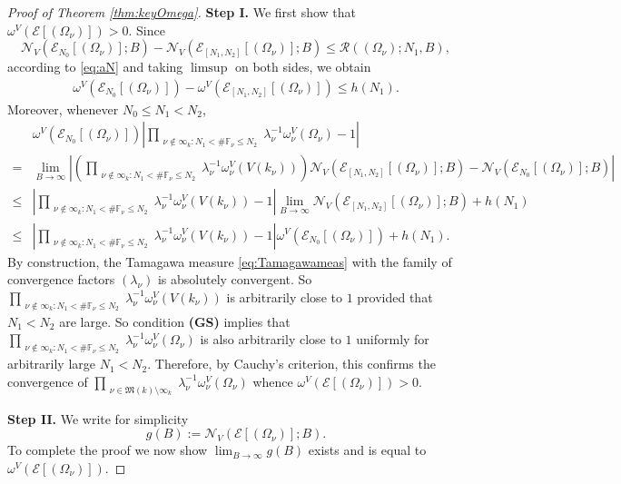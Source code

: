 \documentclass[11pt,letterpaper]{amsart}
\newcommand{\BF}{{\mathbb {F}}}
\newcommand{\CE}{{\mathcal {E}}}
\newcommand{\CN}{{\mathcal {N}}}
\newcommand{\CR}{{\mathcal {R}}}
\theoremstyle{plain}
\numberwithin{equation}{section}
\theoremstyle{definition}
\theoremstyle{remark}
\begin{document}
\begin{proof}[Proof of Theorem \ref{thm:keyOmega}]
\textbf{Step I.} We first show that $\omega^V\left(\CE[(\Omega_{\nu})]\right)>0$. Since $$\CN_V(\CE_{N_0}[(\Omega_{\nu})];B)-\CN_V\left(\CE_{[N_1,N_2]}[(\Omega_{\nu})];B\right)\leqslant \CR((\Omega_\nu);N_1,B),$$  according to \eqref{eq:aN} and 
taking $\limsup$ on both sides, we obtain
\begin{align*}
	\omega^V(\CE_{N_0}[(\Omega_{\nu})])-\omega^V(\CE_{[N_1,N_2]}[(\Omega_{\nu})])\leqslant h(N_1).
\end{align*}
Moreover, whenever $N_0\leqslant N_1<N_2$,
\begin{align*}
	&\omega^V(\CE_{N_0}[(\Omega_{\nu})])\left|\prod_{\substack{\nu\notin\infty_k:N_1<\#\BF_\nu\leqslant N_2}}\lambda_\nu^{-1}\omega_\nu^V(\Omega_\nu)-1\right| \\ 
	=&\lim_{B\to\infty}\left|\left(\prod_{\substack{\nu\notin\infty_k:N_1<\#\BF_\nu\leqslant N_2}}\lambda_\nu^{-1}\omega_\nu^V(V(k_\nu))\right)\CN_V\left(\CE_{[N_1,N_2]}[(\Omega_{\nu})];B\right)-\CN_{V}(\CE_{N_0}[(\Omega_{\nu})];B)\right|\\ \leqslant &\left|\prod_{\substack{\nu\notin\infty_k:N_1<\#\BF_\nu\leqslant N_2}}\lambda_\nu^{-1}\omega_\nu^V(V(k_\nu))-1\right|\lim_{B\to\infty}\CN_V\left(\CE_{[N_1,N_2]}[(\Omega_{\nu})];B\right)+h(N_1)\\ \leqslant&\left|\prod_{\substack{\nu\notin\infty_k:N_1<\#\BF_\nu\leqslant N_2}}\lambda_\nu^{-1}\omega_\nu^V(V(k_\nu))-1\right|\omega^V(\CE_{N_0}[(\Omega_{\nu})])+h(N_1).
\end{align*}
By construction, the Tamagawa measure \eqref{eq:Tamagawameas} with the family of convergence factors $(\lambda_\nu)$ is absolutely convergent. So $\prod_{\substack{\nu\notin\infty_k:N_1<\#\BF_\nu\leqslant N_2}}\lambda_\nu^{-1}\omega_\nu^V(V(k_\nu))$ is arbitrarily close to $1$ provided that $N_1<N_2$ are large. So condition \textbf{(GS)} implies that $\prod_{\substack{\nu\notin\infty_k:N_1<\#\BF_\nu\leqslant N_2}}\lambda_\nu^{-1}\omega_\nu^V(\Omega_\nu)$ is also arbitrarily close to $1$ uniformly for arbitrarily large $N_1<N_2$. 
Therefore, by Cauchy's criterion, this confirms the convergence of $\prod_{\substack{\nu\in\mathfrak{M}(k)\setminus\infty_k}}\lambda_\nu^{-1}\omega_\nu^V(\Omega_\nu)$ whence $\omega^V\left(\CE[(\Omega_{\nu})]\right)>0$.

\textbf{Step II.} 
We write for simplicity
$$g(B):=\CN_V\left(\CE[(\Omega_{\nu})];B\right).$$
To complete the proof we now show $\lim_{B\to\infty} g(B)$ exists and is equal to $\omega^V\left(\CE[(\Omega_{\nu})]\right)$.


\end{proof}
\end{document}
